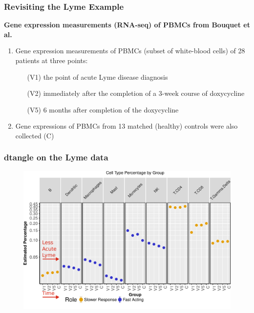 \documentclass[usenames,dvipsnames,15pt]{beamer}
\newcommand{\cbo}{\color{BurntOrange}}
\begin{document}
\begin{frame}
  \frametitle{Revisiting the Lyme Example}
  {\bf Gene expression measurements (RNA-seq) of PBMCs from Bouquet et al.}

  \begin{enumerate}
  \item Gene expression measurements of PBMCs (subset of white-blood cells) of 28 patients at three points:
  \begin{enumerate}
  \item[\cbo(V1)] the point of acute Lyme disease diagnosis
  \item[\cbo(V2)] immediately after the completion of a 3-week course of doxycycline
  \item[\cbo(V5)] 6 months after completion of the doxycycline
  \end{enumerate}
  \item Gene expressions of PBMCs from 13 matched (healthy) controls were also collected {\cbo(C)}
  \end{enumerate}

\end{frame}

\begin{frame}
  \frametitle{dtangle on the Lyme data}
  \vspace*{-.5cm}\begin{figure}
    \hspace*{-.9cm}\includegraphics[scale=.65]{pictures/ctypes.pdf}
  \end{figure}
\end{frame}
\end{document}
